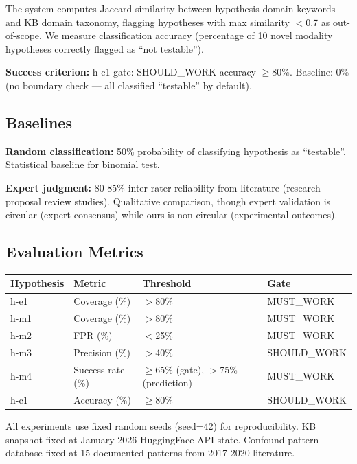 The system computes Jaccard similarity between hypothesis domain keywords and KB domain taxonomy, flagging hypotheses with max similarity $<$0.7 as out-of-scope. We measure classification accuracy (percentage of 10 novel modality hypotheses correctly flagged as ``not testable'').

\textbf{Success criterion:} h-c1 gate: SHOULD\_WORK accuracy $\geq$80\%. Baseline: 0\% (no boundary check --- all classified ``testable'' by default).

\subsection{Baselines}

\textbf{Random classification:} 50\% probability of classifying hypothesis as ``testable''. Statistical baseline for binomial test.

\textbf{Expert judgment:} 80-85\% inter-rater reliability from literature (research proposal review studies). Qualitative comparison, though expert validation is circular (expert consensus) while ours is non-circular (experimental outcomes).

\subsection{Evaluation Metrics}

\begin{table}[h]
\centering
\begin{tabular}{llll}
\toprule
Hypothesis & Metric & Threshold & Gate \\
\midrule
h-e1 & Coverage (\%) & $>$80\% & MUST\_WORK \\
h-m1 & Coverage (\%) & $>$80\% & MUST\_WORK \\
h-m2 & FPR (\%) & $<$25\% & MUST\_WORK \\
h-m3 & Precision (\%) & $>$40\% & SHOULD\_WORK \\
h-m4 & Success rate (\%) & $\geq$65\% (gate), $>$75\% (prediction) & MUST\_WORK \\
h-c1 & Accuracy (\%) & $\geq$80\% & SHOULD\_WORK \\
\bottomrule
\end{tabular}
\end{table}

All experiments use fixed random seeds (seed=42) for reproducibility. KB snapshot fixed at January 2026 HuggingFace API state. Confound pattern database fixed at 15 documented patterns from 2017-2020 literature.
